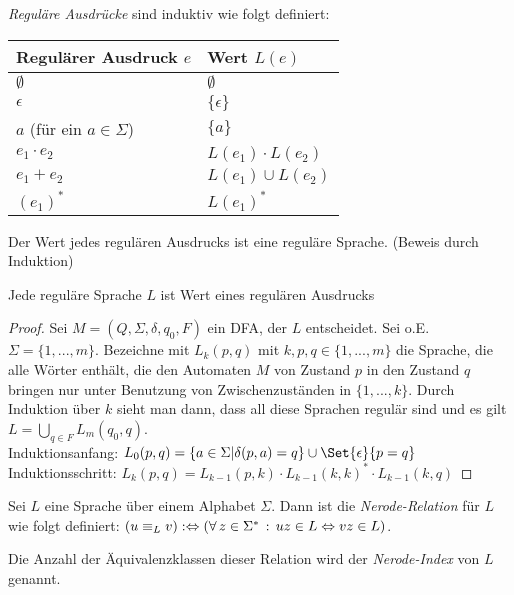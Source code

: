 \documentclass{cheat-sheet}
\begin{document}
\begin{defn}
\emph{Reguläre Ausdrücke} sind induktiv wie folgt definiert:

\begin{center}
\begin{tabular}{ l | l }
  Regulärer Ausdruck $e$ & Wert $L(e)$ \\
  \hline
  $\emptyset$ & $\emptyset$ \\
  $\epsilon$ & $\{\epsilon\}$ \\
  $a$ (für ein $a \in \Sigma$) & $\{ a \}$ \\
  $e_{1} \cdot e_{2}$ & $L(e_{1}) \cdot L(e_{2})$ \\
  $e_{1} + e_{2}$ & $L(e_{1}) \cup L(e_{2})$ \\
  $(e_{1})^{*}$ & $L(e_{1})^{*}$ \\
\end{tabular}
\end{center}

\end{defn}

\begin{satz}
Der Wert jedes regulären Ausdrucks ist eine reguläre Sprache. (Beweis durch Induktion)
\end{satz}

\begin{satz}
Jede reguläre Sprache $L$ ist Wert eines regulären Ausdrucks
\end{satz}

\begin{proof}
Sei $M = (Q, \Sigma, \delta, q_{0}, F)$ ein DFA, der $L$ entscheidet. Sei o.E. $\Sigma = \{ 1, ..., m \}$. Bezeichne mit $L_{k}(p, q)$ mit $k, p, q \in \{1, ..., m\}$ die Sprache, die alle Wörter enthält, die den Automaten $M$ von Zustand $p$ in den Zustand $q$ bringen nur unter Benutzung von Zwischenzuständen in $\{ 1, ..., k \}$. Durch Induktion über $k$ sieht man dann, dass all diese Sprachen regulär sind und es gilt $L = \bigcup_{q \in F} L_{m}(q_{0}, q)$.\\
Induktionsanfang: $L_{0}(p, q) = \{ a \in \Sigma | \delta(p, a) = q \} \cup \Set{\epsilon}{p = q}$ \\
Induktionsschritt: $L_{k}(p, q) = L_{k-1}(p, k) \cdot L_{k-1}(k, k)^{*} \cdot L_{k-1}(k, q)$
\end{proof}

\begin{defn}
Sei $L$ eine Sprache über einem Alphabet $\Sigma$. Dann ist die \emph{Nerode-Relation} für $L$ wie folgt definiert: $(u \equiv_{L} v) :\Leftrightarrow (\forall \, {z \in \Sigma^{*}} \,:\, uz \in L \Leftrightarrow vz \in L)$.

Die Anzahl der Äquivalenzklassen dieser Relation wird der \emph{Nerode-Index} von $L$ genannt.
\end{defn}
\end{document}
